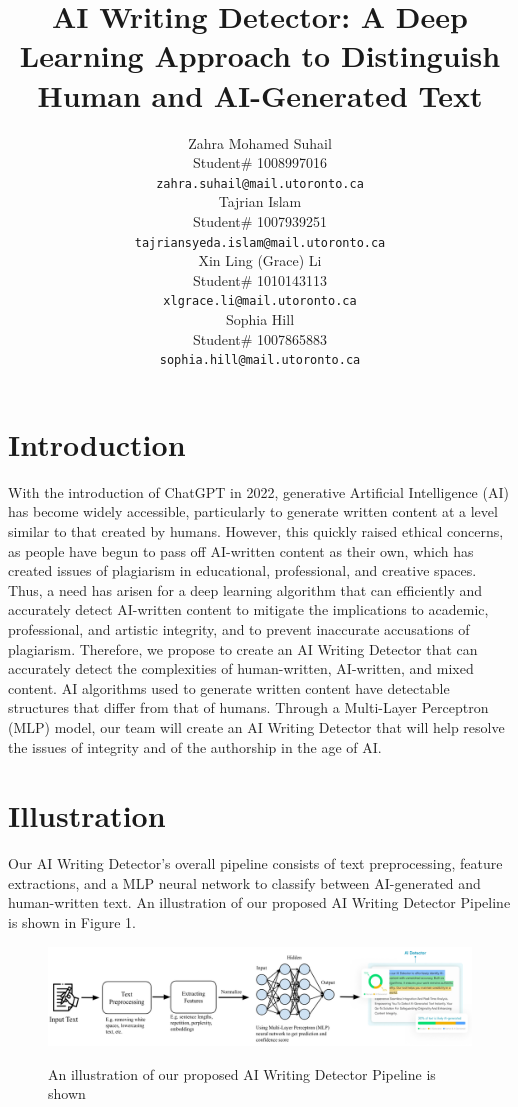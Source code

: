 \documentclass{article} %
\title{AI Writing Detector: A Deep Learning Approach to Distinguish Human and AI-Generated Text}
\author{Zahra Mohamed Suhail  \\
Student\# 1008997016 \\
\texttt{zahra.suhail@mail.utoronto.ca} \\
\And
Tajrian Islam \\
Student\# 1007939251 \\
\texttt{tajriansyeda.islam@mail.utoronto.ca} \\
\And
Xin Ling (Grace) Li  \\
Student\# 1010143113 \\
\texttt{xlgrace.li@mail.utoronto.ca} \\
\And
Sophia Hill  \\
Student\# 1007865883 \\
\texttt{sophia.hill@mail.utoronto.ca} \\
\And
}
\begin{document}
\maketitle
\newpage

\section{Introduction}
With the introduction of ChatGPT in 2022, generative Artificial Intelligence (AI) has become widely accessible, particularly to generate written content at a level similar to that created by humans. However, this quickly raised ethical concerns, as people have begun to pass off AI-written content as their own, which has created issues of plagiarism in educational, professional, and creative spaces. Thus, a need has arisen for a deep learning algorithm that can efficiently and accurately detect AI-written content to mitigate the implications to academic, professional, and artistic integrity, and to prevent inaccurate accusations of plagiarism. Therefore, we propose to create an AI Writing Detector that can accurately detect the complexities of human-written, AI-written, and mixed content. AI algorithms used to generate written content have detectable structures that differ from that of humans. Through a Multi-Layer Perceptron (MLP) model, our team will create an AI Writing Detector that will help resolve the issues of integrity and of the authorship in the age of AI.

\section{Illustration}
Our AI Writing Detector's overall pipeline consists of text preprocessing, feature extractions, and a MLP neural network to classify between AI-generated and human-written text. An illustration of our proposed AI Writing Detector Pipeline is shown in Figure 1.

\begin{figure}[htbp]
    \centering
    \includegraphics[width=0.9\linewidth]{illustration.png}
    \caption{An illustration of our proposed AI Writing Detector Pipeline is shown} \citep{Freepik}
    \label{fig:pipeline}
\end{figure}
\end{document}
